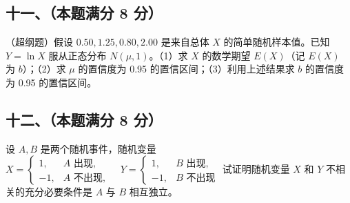 \documentclass[UTF8,12pt]{ctexart}
\begin{document}
\subsection*{十一、（本题满分 8 分）}

（超纲题）假设 \(\displaystyle 0.50,\allowbreak 1.25,\allowbreak 0.80,\allowbreak 2.00\) 是来自总体 \(\displaystyle X\) 的简单随机样本值。已知 \(\displaystyle Y=\ln X\) 服从正态分布 \(\displaystyle N(\mu,\allowbreak 1)\)。（1）求 \(\displaystyle X\) 的数学期望 \(\displaystyle E(X)\)（记 \(\displaystyle E(X)\) 为 \(\displaystyle b\)）；（2）求 \(\displaystyle \mu\) 的置信度为 0.95 的置信区间；（3）利用上述结果求 \(\displaystyle b\) 的置信度为 0.95 的置信区间。


\subsection*{十二、（本题满分 8 分）}

设 \(\displaystyle A,\allowbreak B\) 是两个随机事件，随机变量 \(\displaystyle X=\begin{cases}1,\allowbreak &A\text{ 出现},\allowbreak \\-1,\allowbreak &A\text{ 不出现},\allowbreak \end{cases}\quad Y=\begin{cases}1,\allowbreak &B\text{ 出现},\allowbreak \\-1,\allowbreak &B\text{ 不出现}\end{cases}\) 试证明随机变量 \(\displaystyle X\) 和 \(\displaystyle Y\) 不相关的充分必要条件是 \(\displaystyle A\) 与 \(\displaystyle B\) 相互独立。
\end{document}
